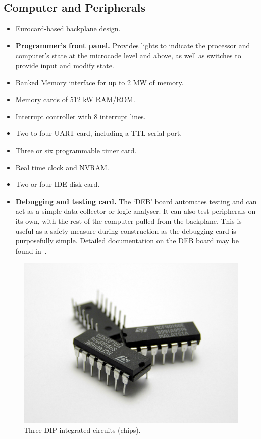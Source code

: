 \subsection{Computer and Peripherals}

\begin{itemize}
\item Eurocard-based backplane design.
\item \textbf{Programmer's front panel.} Provides lights to indicate
  the processor and computer's state at the microcode level and above,
  as well as switches to provide input and modify state.
\item Banked Memory interface for up to 2 MW of memory.
\item Memory cards of 512 kW RAM/ROM.
\item Interrupt controller with 8 interrupt lines.
\item Two to four UART card, including a TTL serial port.
\item Three or six programmable timer card.
\item Real time clock and NVRAM.
\item Two or four IDE disk card.
\item \textbf{Debugging and testing card.} The ‘\gls{DEB}’ board automates
  testing and can act as a simple data collector or logic analyser. It can also
  test peripherals on its own, with the rest of the computer pulled from the
  backplane. This is useful as a safety measure during construction as the
  debugging card is purposefully simple. Detailed documentation on the
  \gls{DEB} board may be found in~.
\end{itemize}

\begin{figure}
  \centering
  \includegraphics[width=0.5\columnwidth]{figs/Three_IC_circuit_chips.JPG}
  \caption{Three DIP integrated circuits (chips).}
\end{figure}


